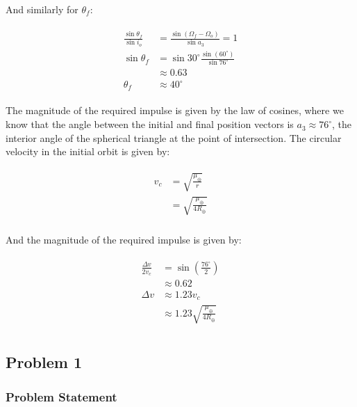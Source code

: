 \documentclass[
]{article}
\begin{document}
And similarly for \(\theta_f\):

\[\begin{aligned}
\begin{aligned}
    \frac{\sin\theta_f}{\sin i_o} &= \frac{\sin(\Omega_f - \Omega_o)}{\sin a_3} = 1 \\
    \sin\theta_f &= \sin 30^\circ \frac{\sin(60^\circ)}{\sin 76^\circ} \\
    &\approx 0.63 \\
    \theta_f &\approx 40^\circ
\end{aligned}
\end{aligned}\]

The magnitude of the required impulse is given by the law of cosines,
where we know that the angle between the initial and final position
vectors is \(a_3 \approx 76^\circ\), the interior angle of the spherical
triangle at the point of intersection. The circular velocity in the
initial orbit is given by:

\[\begin{aligned}
\begin{aligned}
    v_c &= \sqrt{\frac{\mu_\oplus}{r}} \\
    &= \sqrt{\frac{\mu_\oplus}{4R_\oplus}} \\
\end{aligned}
\end{aligned}\]

And the magnitude of the required impulse is given by:

\[\begin{aligned}
\begin{aligned}
    \frac{\Delta v}{2 v_c} &= \sin\left( \frac{76^\circ}{2} \right) \\
    &\approx 0.62 \\
    \Delta v &\approx 1.23 v_c \\
    &\approx 1.23 \sqrt{\frac{\mu_\oplus}{4R_\oplus}} \\
\end{aligned}
\end{aligned}\]

\subsection{Problem 1}\label{problem-1}

\subsubsection{Problem Statement}\label{problem-statement-2}
\end{document}
